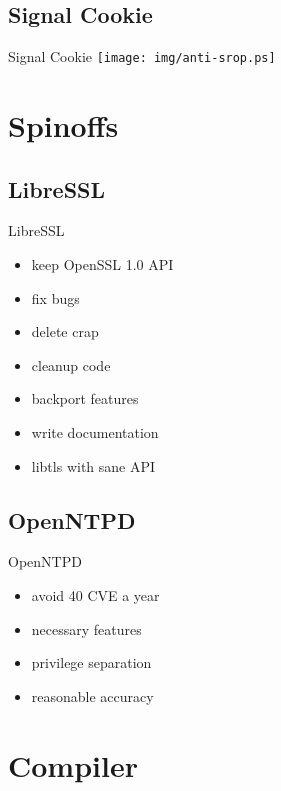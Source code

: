 \documentclass[14pt]{beamer}
\begin{document}
\subsection{Signal Cookie}
\begin{frame}{Signal Cookie}
\texttt{[image: img/anti-srop.ps]}
\end{frame}

\section{Spinoffs}

\subsection{LibreSSL}
\begin{frame}{LibreSSL}
\begin{itemize}
    \item keep OpenSSL 1.0 API
    \item fix bugs
    \item delete crap
    \item cleanup code
    \item backport features
    \item write documentation
    \item libtls with sane API
\end{itemize}
\end{frame}

\subsection{OpenNTPD}
\begin{frame}{OpenNTPD}
\begin{itemize}
    \item avoid 40 CVE a year
    \item necessary features
    \item privilege separation
    \item reasonable accuracy
\end{itemize}
\end{frame}

\section{Compiler}
\end{document}
